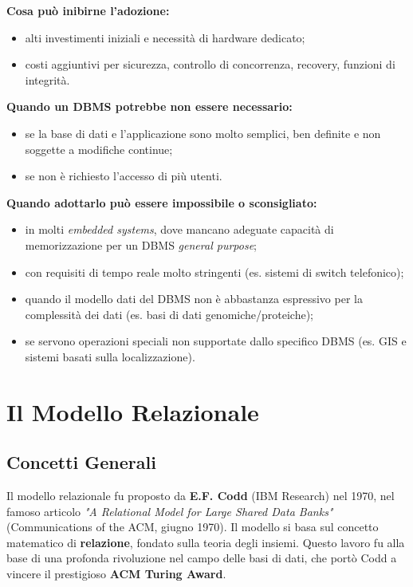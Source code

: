 \documentclass[12pt, a4paper]{article}
\begin{document}
\textbf{Cosa può inibirne l'adozione:}
\begin{itemize}
    \item alti investimenti iniziali e necessità di hardware dedicato;
    \item costi aggiuntivi per sicurezza, controllo di concorrenza, recovery, funzioni di integrità.
\end{itemize}

\textbf{Quando un DBMS potrebbe non essere necessario:}
\begin{itemize}
    \item se la base di dati e l'applicazione sono molto semplici, ben definite e non soggette a modifiche continue;
    \item se non è richiesto l'accesso di più utenti.
\end{itemize}

\textbf{Quando adottarlo può essere impossibile o sconsigliato:}
\begin{itemize}
    \item in molti \textit{embedded systems}, dove mancano adeguate capacità di memorizzazione per un DBMS \textit{general purpose};
    \item con requisiti di tempo reale molto stringenti (es. sistemi di switch telefonico);
    \item quando il modello dati del DBMS non è abbastanza espressivo per la complessità dei dati (es. basi di dati genomiche/proteiche);
    \item se servono operazioni speciali non supportate dallo specifico DBMS (es. GIS e sistemi basati sulla localizzazione).
\end{itemize}


\section{Il Modello Relazionale}

\subsection{Concetti Generali}

Il modello relazionale fu proposto da \textcolor{tocsec}{\textbf{E.F. Codd}} (IBM Research) nel 1970, nel famoso articolo \textit{"A Relational Model for Large Shared Data Banks"} (Communications of the ACM, giugno 1970). Il modello si basa sul concetto matematico di \textbf{relazione}, fondato sulla teoria degli insiemi. Questo lavoro fu alla base di una profonda rivoluzione nel campo delle basi di dati, che portò Codd a vincere il prestigioso \textbf{ACM Turing Award}.
\end{document}
